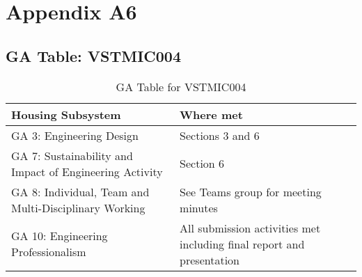 \documentclass[class=report,11pt,crop=false]{standalone}
\begin{document}
	\chapter{Appendix A6}
	\section{GA Table: VSTMIC004}
	\begin{table}[h!]
		\centering
		\caption{GA Table for VSTMIC004}
		\begin{tabularx}{0.8\textwidth}
			{ 
				| >{\centering\arraybackslash}X 
				| >{\centering\arraybackslash}X |}
			\hline
			\textbf{Housing Subsystem} & \textbf{Where met}                                                    \\ \hline
			GA 3: Engineering Design                                                                                               & Sections 3 and 6                                                      \\ \hline
			GA 7: Sustainability and Impact of Engineering Activity                                                                & Section 6                                                             \\ \hline
			GA 8: Individual, Team and Multi-Disciplinary Working                                                                  & See Teams group for meeting minutes                                   \\ \hline
			GA 10: Engineering Professionalism                                                                                     & All submission activities met including final report and presentation \\ \hline
		\end{tabularx}
		\label{tab:A6}
		
	\end{table}
	\ifstandalone
	
	\printnoidxglossary[type=\acronymtype,nonumberlist]
	\fi
\end{document}
